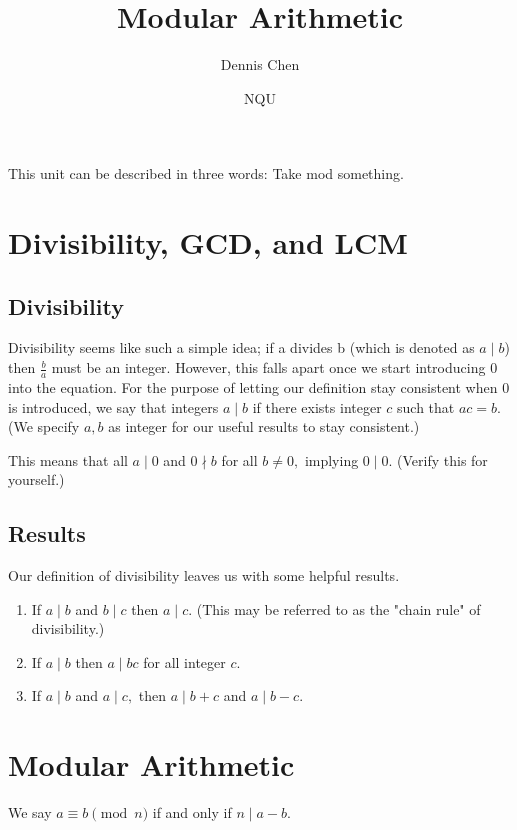 \documentclass{article}
\title{Modular Arithmetic}
\author{Dennis Chen}
\date{NQU}
\begin{document}
\maketitle

This unit can be described in three words: Take mod something.

\section{Divisibility, GCD, and LCM}
\subsection{Divisibility}
Divisibility seems like such a simple idea; if a divides b (which is denoted as $a\mid b$) then $\frac{b}{a}$ must be an integer. However, this falls apart once we start introducing $0$ into the equation. For the purpose of letting our definition stay consistent when $0$ is introduced, we say that integers $a\mid b$ if there exists integer $c$ such that $ac=b.$ (We specify $a,b$ as integer for our useful results to stay consistent.)

This means that all $a\mid 0$ and $0\nmid b$ for all $b\neq 0,$ implying $0\mid 0.$ (Verify this for yourself.)
\subsection{Results}
Our definition of divisibility leaves us with some helpful results.
\begin{fact}
\hfill
\begin{enumerate}
    \item If $a\mid b$ and $b\mid c$ then $a\mid c.$ (This may be referred to as the "chain rule" of divisibility.)
    
    \item If $a\mid b$ then $a\mid bc$ for all integer $c.$
    
    \item If $a\mid b$ and $a\mid c,$ then $a\mid b+c$ and $a\mid b-c.$
\end{enumerate}
\end{fact}

\section{Modular Arithmetic}
\begin{defi}
We say $a\equiv b\pmod {n}$ if and only if $n\mid a-b.$
\end{defi}
\end{document}
